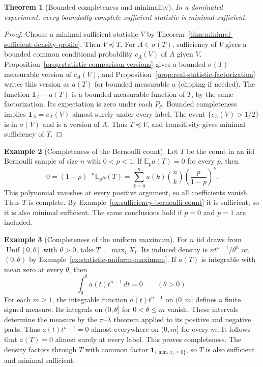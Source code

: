 \documentclass[11pt,oneside]{book}
\newtheorem{theorem}{Theorem}[chapter]
\theoremstyle{definition}
\newtheorem{example}[theorem]{Example}
\theoremstyle{remark}
\begin{document}
\begin{theorem}[Bounded completeness and minimality]
\label{thm:bounded-complete-sufficient-minimal}
In a dominated experiment, every boundedly complete sufficient
statistic is minimal sufficient.
\end{theorem}
\begin{proof}
Choose a minimal sufficient statistic $V$ by
Theorem~\ref{thm:minimal-sufficient-density-profile}. Then $V\preceq T$.
For $A\in\sigma(T)$, sufficiency of $V$ gives a bounded common
conditional probability $c_A(V)$ of $A$ given $V$.
Proposition~\ref{prop:statistic-comparison-versions} gives a bounded
$\sigma(T)$-measurable version of $c_A(V)$, and
Proposition~\ref{prop:real-statistic-factorization} writes this
version as $a(T)$ for bounded measurable $a$ (clipping if needed).
The function $\mathbf 1_A-a(T)$ is a bounded measurable function
of $T$, by the same factorization. Its expectation is zero under
each $P_\theta$. Bounded completeness implies
$\mathbf 1_A=c_A(V)$ almost surely under every label.
The event $\{c_A(V)>1/2\}$ is in $\sigma(V)$ and is a version of $A$.
Thus $T\preceq V$, and transitivity gives minimal sufficiency of $T$.
\end{proof}

\begin{example}[Completeness of the Bernoulli count]
\label{ex:complete-bernoulli-count}
Let $T$ be the count in an iid Bernoulli sample of size $n$ with
$0<p<1$. If $\mathbb E_p a(T)=0$ for every $p$, then
\[
0=(1-p)^{-n}\mathbb E_p a(T)
=\sum_{k=0}^n a(k)\binom nk \left(\frac{p}{1-p}\right)^k .
\]
This polynomial vanishes at every positive argument, so all
coefficients vanish. Thus $T$ is complete. By
Example~\ref{ex:sufficiency-bernoulli-count} it is sufficient,
so it is also minimal sufficient. The same conclusions hold
if $p=0$ and $p=1$ are included.
\end{example}

\begin{example}[Completeness of the uniform maximum]
\label{ex:complete-uniform-maximum}
For $n$ iid draws from $\operatorname{Unif}[0,\theta]$ with
$\theta>0$, take $T=\max_i X_i$. Its induced density is
$nt^{n-1}/\theta^n$ on $(0,\theta)$ by
Example~\ref{ex:statistic-uniform-maximum}. If $a(T)$ is integrable
with mean zero at every $\theta$, then
\[
\int_0^\theta a(t)t^{n-1}\,dt=0\qquad(\theta>0).
\]
For each $m\geq1$, the integrable function $a(t)t^{n-1}$ on $(0,m]$
defines a finite signed measure. Its integrals on $(0,\theta]$
for $0<\theta\leq m$ vanish. These intervals determine the measure
by the $\pi$--$\lambda$ theorem applied to its positive and negative
parts. Thus $a(t)t^{n-1}=0$ almost everywhere on $(0,m]$ for every
$m$. It follows that $a(T)=0$ almost surely at every label.
This proves completeness. The density factors through $T$ with
common factor $\mathbf 1_{\{\min_i x_i\geq0\}}$, so $T$ is also
sufficient and minimal sufficient.
\end{example}
\end{document}

